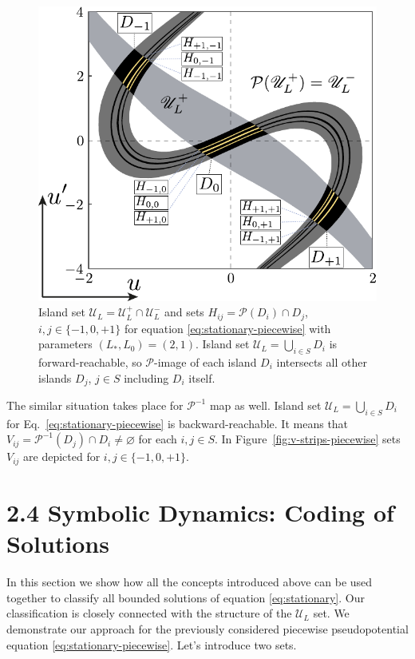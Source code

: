 \begin{figure}[h]
\centering
	\includegraphics[scale = 1]{pic/h-strips for piecewise equation}
	\caption{
		Island set $\mathscr{U}_L = \mathscr{U}_L^+ \cap \mathscr{U}_L^-$ and sets $H_{ij} = \mathcal{P}(D_i) \cap D_j$, $i, j \in \{ -1, 0, +1 \}$ for equation \eqref{eq:stationary-piecewise} with parameters $(L_*, L_0) = (2, 1)$.
		Island set $\mathscr{U}_L = \bigcup_{i \in S} D_i$ is forward-reachable, so $\mathcal{P}$-image of each island $D_i$ intersects all other islands $D_j$, $j \in S$ including $D_i$ itself.
	}
\label{fig:h-strips-piecewise}
\end{figure}

The similar situation takes place for $\mathcal{P}^{-1}$ map as well.
Island set $\mathscr{U}_L = \bigcup_{i \in S} D_i$ for Eq.~\eqref{eq:stationary-piecewise} is backward-reachable.
It means that $V_{ij} = \mathcal{P}^{-1}(D_j) \cap D_i \neq \varnothing$ for each $i, j \in S$.
In Figure~\ref{fig:v-strips-piecewise} sets $V_{ij}$ are depicted for $i, j \in \{ -1, 0, +1 \}$.

\section*{2.4 Symbolic Dynamics: Coding of Solutions}

In this section we show how all the concepts introduced above can be used together to classify all bounded solutions of equation \eqref{eq:stationary}.
Our classification is closely connected with the structure of the $\mathscr{U}_L$ set.
We demonstrate our approach for the previously considered piecewise pseudopotential equation \eqref{eq:stationary-piecewise}.
Let's introduce two sets.

